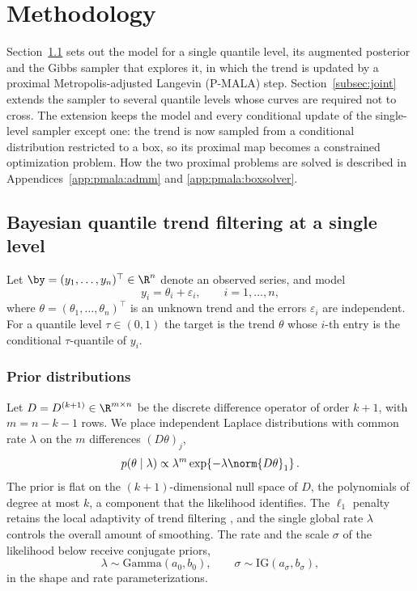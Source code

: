 \section{Methodology}
\label{sec:methodology}

Section~\ref{subsec:individual} sets out the model for a single quantile level, its augmented posterior and the Gibbs sampler that explores it, in which the trend is updated by a proximal Metropolis-adjusted Langevin (P-MALA) step. Section~\ref{subsec:joint} extends the sampler to several quantile levels whose curves are required not to cross. The extension keeps the model and every conditional update of the single-level sampler except one: the trend is now sampled from a conditional distribution restricted to a box, so its proximal map becomes a constrained optimization problem. How the two proximal problems are solved is described in Appendices~\ref{app:pmala:admm} and \ref{app:pmala:boxsolver}.

\subsection{Bayesian quantile trend filtering at a single level}
\label{subsec:individual}

Let $\by = (y_1, \ldots, y_n)^\top \in \R^n$ denote an observed series, and model
\begin{equation}
    y_i = \theta_i + \varepsilon_i, \qquad i = 1, \ldots, n,
    \label{eq:datamodel}
\end{equation}
where $\theta = (\theta_1, \ldots, \theta_n)^\top$ is an unknown trend and the errors $\varepsilon_i$ are independent. For a quantile level $\tau \in (0,1)$ the target is the trend $\theta$ whose $i$-th entry is the conditional $\tau$-quantile of $y_i$.

\subsubsection{Prior distributions}
\label{subsec:model}

Let $D = D^{(k+1)} \in \R^{m \times n}$ be the discrete difference operator of order $k+1$, with $m = n - k - 1$ rows. We place independent Laplace distributions with common rate $\lambda$ on the $m$ differences $(D\theta)_j$,
\begin{equation}
    p(\theta \mid \lambda) \propto \lambda^{m} \exp\!\left\{-\lambda \norm{D\theta}_1\right\}.
    \label{eq:prior_theta}
\end{equation}
The prior is flat on the $(k+1)$-dimensional null space of $D$, the polynomials of degree at most $k$, a component that the likelihood identifies. The $\ell_1$ penalty retains the local adaptivity of trend filtering \citep{tibshirani2014adaptive}, and the single global rate $\lambda$ controls the overall amount of smoothing. The rate and the scale $\sigma$ of the likelihood below receive conjugate priors,
\begin{equation}
    \lambda \sim \mathrm{Gamma}(a_0, b_0), \qquad \sigma \sim \mathrm{IG}(a_\sigma, b_\sigma),
    \label{eq:hyperpriors}
\end{equation}
in the shape and rate parameterizations.

